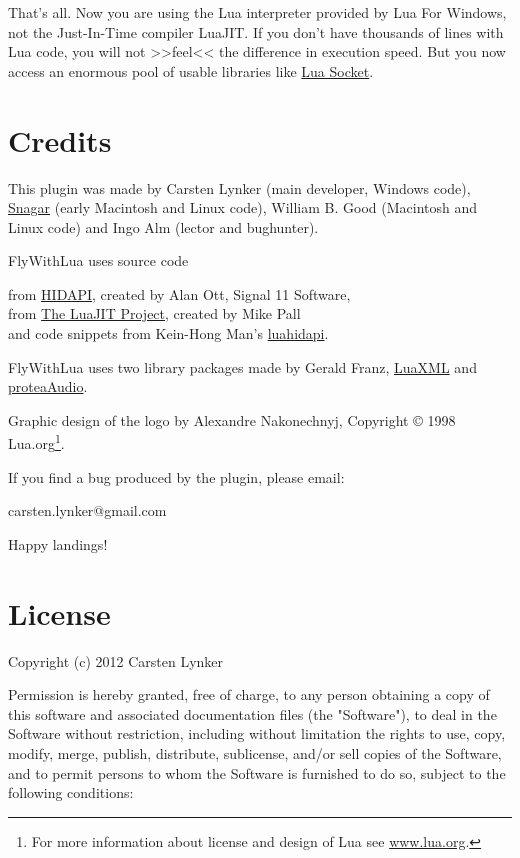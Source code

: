 \documentclass[11pt,parskip=half,a4paper]{scrartcl}
\begin{document}
That's all. Now you are using the Lua interpreter provided by Lua For Windows, not the Just-In-Time compiler LuaJIT. If you don't have thousands of lines with Lua code, you will not >>feel<< the difference in execution speed. But you now access an enormous pool of usable libraries like \href{http://w3.impa.br/~diego/software/luasocket/}{Lua Socket}.

\newpage
\section{Credits}

This plugin was made by Carsten Lynker (main developer, Windows code), \href{http://www.snagar.org/}{Snagar} (early Macintosh and Linux code), William B. Good (Macintosh and Linux code) and Ingo Alm (lector and bughunter).

FlyWithLua uses source code

from \href{http://www.signal11.us/oss/hidapi/}{HIDAPI}, created by Alan Ott, Signal 11 Software,\\
from \href{http://luajit.org/}{The LuaJIT Project}, created by Mike Pall\\
and code snippets from Kein-Hong Man's \href{https://sites.google.com/site/rubblepiles/hardware-stuff}{luahidapi}.

FlyWithLua uses two library packages made by Gerald Franz, \href{http://viremo.eludi.net/LuaXML/index.html}{LuaXML} and \href{http://viremo.eludi.net/proteaAudio/proteaaudiolua.html}{proteaAudio}.

Graphic design of the logo by Alexandre Nakonechnyj, Copyright © 1998 Lua.org\footnote{For more information about license and design of Lua see \url{www.lua.org}.}.

If you find a bug produced by the plugin, please email:

carsten.lynker@gmail.com

Happy landings!

\section{License}

Copyright (c) 2012 Carsten Lynker

Permission is hereby granted, free of charge, to any person obtaining a copy of this software and associated documentation files (the "Software"), to deal in the Software without restriction, including without limitation the rights to use, copy, modify, merge, publish, distribute, sublicense, and/or sell copies of the Software, and to permit persons to whom the Software is furnished to do so, subject to the following conditions:
\end{document}
